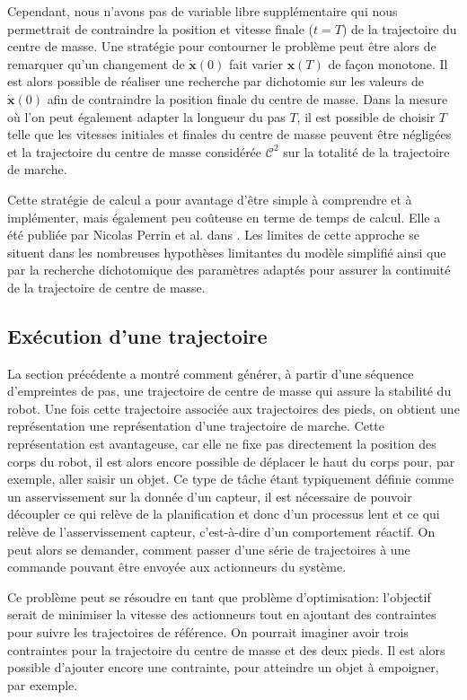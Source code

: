 Cependant, nous n'avons pas de variable libre supplémentaire qui nous
permettrait de contraindre la position et vitesse finale ($t=T$) de la
trajectoire du centre de masse. Une stratégie pour contourner le
problème peut être alors de remarquer qu'un changement de
$\dot{\mathbf{x}}(0)$ fait varier $\mathbf{x}(T)$ de façon
monotone. Il est alors possible de réaliser une recherche par
dichotomie sur les valeurs de $\dot{\mathbf{x}}(0)$ afin de
contraindre la position finale du centre de masse. Dans la mesure où
l'on peut également adapter la longueur du pas $T$, il est possible de
choisir $T$ telle que les vitesses initiales et finales du centre de
masse peuvent être négligées et la trajectoire du centre de masse
considérée $\mathcal{C}^2$ sur la totalité de la trajectoire de
marche.


Cette stratégie de calcul a pour avantage d'être simple à comprendre
et à implémenter, mais également peu coûteuse en terme de temps de
calcul. Elle a été publiée par Nicolas Perrin et al. dans
\cite{11perrin.icra}. Les limites de cette approche se situent dans
les nombreuses hypothèses limitantes du modèle simplifié ainsi que par
la recherche dichotomique des paramètres adaptés pour assurer la
continuité de la trajectoire de centre de masse.


\subsection{Exécution d'une trajectoire}


La section précédente a montré comment générer, à partir d'une
séquence d'empreintes de pas, une trajectoire de centre de masse qui
assure la stabilité du robot. Une fois cette trajectoire associée aux
trajectoires des pieds, on obtient une représentation une
représentation d'une trajectoire de marche. Cette représentation est
avantageuse, car elle ne fixe pas directement la position des corps du
robot, il est alors encore possible de déplacer le haut du corps pour,
par exemple, aller saisir un objet. Ce type de tâche étant typiquement
définie comme un asservissement sur la donnée d'un capteur, il est
nécessaire de pouvoir découpler ce qui relève de la planification et
donc d'un processus lent et ce qui relève de l'asservissement capteur,
c'est-à-dire d'un comportement réactif. On peut alors se demander,
comment passer d'une série de trajectoires à une commande pouvant être
envoyée aux actionneurs du système.


Ce problème peut se résoudre en tant que problème d'optimisation:
l'objectif serait de minimiser la vitesse des actionneurs tout en
ajoutant des contraintes pour suivre les trajectoires de référence. On
pourrait imaginer avoir trois contraintes pour la trajectoire du
centre de masse et des deux pieds. Il est alors possible d'ajouter
encore une contrainte, pour atteindre un objet à empoigner, par
exemple.


